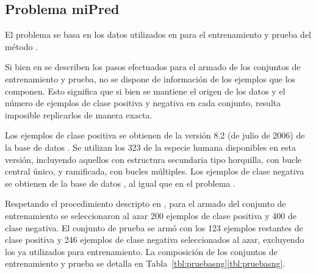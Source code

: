 %
%
\subsection{Problema miPred}
%
El problema \mipred{} se basa en los datos utilizados en \cite{ng}
para el entrenamiento y prueba del método \work\mipred.

Si bien en \cite{ng} se describen los pasos efectuados para el armado
de los conjuntos de entrenamiento y prueba, no se dispone de
información de los ejemplos que los componen.
Esto significa que si bien se mantiene el origen de los datos y el
número de ejemplos de clase positiva y negativa en cada conjunto,
resulta imposible replicarlos de manera exacta.

Los ejemplos de clase positiva se obtienen de la versión 8.2 (de julio
de 2006) de la base de datos \work{\mirbase}.
Se utilizan los 323  de la especie humana disponibles en
esta versión, incluyendo aquellos con estructura secundaria tipo
horquilla, con bucle central único, y ramificada, con bucles
múltiples.
Los ejemplos de clase negativa se obtienen de la base de datos
, al igual que en el problema \prob\tripletsvm.

Respetando el procedimiento descripto en \cite{ng}, para el armado del
conjunto de entrenamiento  se seleccionaron al azar 200
ejemplos de clase positiva y 400 de clase negativa.
El conjunto de prueba  se armó con los 123 ejemplos
restantes de clase positiva y 246 ejemplos de clase negativa
seleccionados al azar, excluyendo los ya utilizados para
entrenamiento.
La composición de los conjuntos de entrenamiento y prueba se detalla
en \iflatexml{}Tabla~\ref{tbl:pruebasng}\else\autoref{tbl:pruebasng}\fi.
